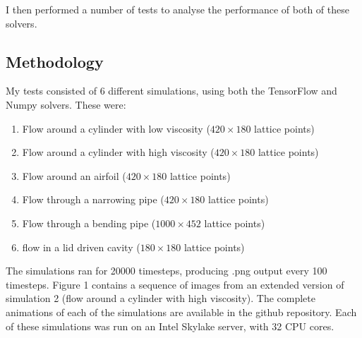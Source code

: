 \documentclass{article}
\begin{document}
I then performed a number of tests to analyse the performance of both of these solvers.

\subsection{Methodology}

My tests consisted of 6 different simulations, using both the TensorFlow and Numpy solvers. These were:

\begin{enumerate}
    \item Flow around a cylinder with low viscosity ($420\times180$ lattice points)
    \item Flow around a cylinder with high viscosity ($420\times180$ lattice points)
    \item Flow around an airfoil ($420\times180$ lattice points)
    \item Flow through a narrowing pipe ($420\times180$ lattice points)
    \item Flow through a bending pipe ($1000\times452$ lattice points)
    \item flow in a lid driven cavity ($180\times180$ lattice points)
\end{enumerate}

The simulations ran for 20000 timesteps, producing .png output every 100 timesteps. Figure 1 contains a sequence of images from an extended version of simulation 2 (flow around a cylinder with high viscosity). The complete animations of each of the simulations are available in the github repository. Each of these simulations was run on an Intel Skylake server, with 32 CPU cores.
\end{document}
